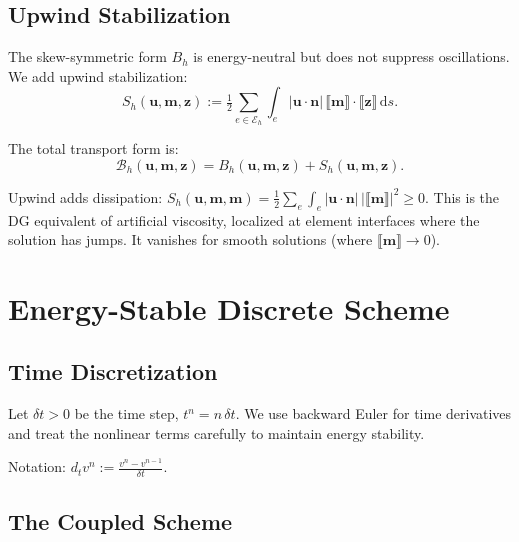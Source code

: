 \documentclass[11pt,a4paper]{article}
\theoremstyle{definition}
\theoremstyle{remark}
\newcommand{\dd}{\,\mathrm{d}}
\newcommand{\half}{\tfrac{1}{2}}
\newcommand{\jump}[1]{\llbracket #1 \rrbracket}
\newcommand{\bfu}{\bm{u}}
\newcommand{\bfm}{\bm{m}}
\newcommand{\bfn}{\bm{n}}
\newcommand{\bfz}{\bm{z}}
\newcommand{\Eh}{\mathcal{E}_h}
\begin{document}
\subsection{Upwind Stabilization}
\label{sec:upwind}

The skew-symmetric form $B_h$ is energy-neutral but does not suppress
oscillations. We add upwind stabilization:
\begin{equation}
  \label{eq:upwind}
  S_h(\bfu, \bfm, \bfz) :=
  \half \sum_{e \in \Eh} \int_e |\bfu \cdot \bfn|\,
  \jump{\bfm} \cdot \jump{\bfz} \dd s.
\end{equation}

The total transport form is:
\begin{equation}
  \label{eq:transport-total}
  \mathcal{B}_h(\bfu, \bfm, \bfz) = B_h(\bfu, \bfm, \bfz)
  + S_h(\bfu, \bfm, \bfz).
\end{equation}

\begin{derivnote}
Upwind adds dissipation: $S_h(\bfu,\bfm,\bfm) = \half\sum_e\int_e |\bfu\cdot\bfn|\,|\jump{\bfm}|^2 \geq 0$.
This is the DG equivalent of artificial viscosity, localized at element
interfaces where the solution has jumps. It vanishes for smooth solutions
(where $\jump{\bfm} \to 0$).
\end{derivnote}


\section{Energy-Stable Discrete Scheme}
\label{sec:scheme}

\subsection{Time Discretization}

Let $\delta t > 0$ be the time step, $t^n = n\,\delta t$. We use
backward Euler for time derivatives and treat the nonlinear terms
carefully to maintain energy stability.

Notation: $d_t v^n := \frac{v^n - v^{n-1}}{\delta t}$.

\subsection{The Coupled Scheme}
\end{document}
